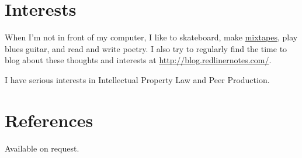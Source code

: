 \documentclass[margintitle,line]{res}
\begin{document}
\begin{resume}

\section{Interests}

When I'm not in front of my computer, I like to skateboard, make
\href{http://soundcloud.com/redlinernotes}{mixtapes}, play blues guitar, and
read and write poetry. I also try to regularly find the time to blog about
these thoughts and interests at \url{http://blog.redlinernotes.com/}.

I have serious interests in Intellectual Property Law and Peer Production.


\section{References}

Available on request.

\end{resume}
\end{document}
